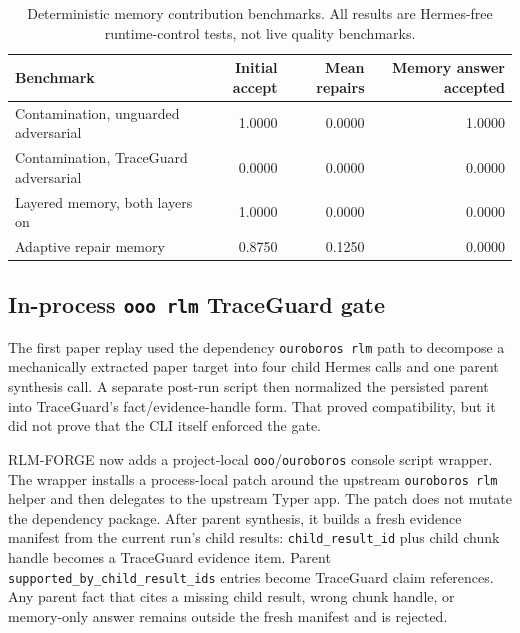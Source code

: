 \documentclass[11pt,a4paper]{article}
\begin{document}
\begin{table}[t]
\centering
\caption{Deterministic memory contribution benchmarks. All results are
Hermes-free runtime-control tests, not live quality benchmarks.}
\label{tab:memory-contribution}
\small
\begin{tabular}{lrrr}
\toprule
Benchmark & Initial accept & Mean repairs & Memory answer accepted \\
\midrule
Contamination, unguarded adversarial & 1.0000 & 0.0000 & 1.0000 \\
Contamination, TraceGuard adversarial & 0.0000 & 0.0000 & 0.0000 \\
Layered memory, both layers on & 1.0000 & 0.0000 & 0.0000 \\
Adaptive repair memory & 0.8750 & 0.1250 & 0.0000 \\
\bottomrule
\end{tabular}
\end{table}

\subsection{In-process \texttt{ooo rlm} TraceGuard gate}
\label{sec:inprocess-gate}

The first paper replay used the dependency \texttt{ouroboros rlm} path to
decompose a mechanically extracted paper target into four child Hermes calls
and one parent synthesis call. A separate post-run script then normalized the
persisted parent into TraceGuard's fact/evidence-handle form. That proved
compatibility, but it did not prove that the CLI itself enforced the gate.

RLM-FORGE now adds a project-local \texttt{ooo}/\texttt{ouroboros} console
script wrapper. The wrapper installs a process-local patch around the upstream
\texttt{ouroboros rlm} helper and then delegates to the upstream Typer app.
The patch does not mutate the dependency package. After parent synthesis, it
builds a fresh evidence manifest from the current run's child results:
\texttt{child\_result\_id} plus child chunk handle becomes a
TraceGuard evidence item. Parent \texttt{supported\_by\_child\_result\_ids}
entries become TraceGuard claim references. Any parent fact that cites a
missing child result, wrong chunk handle, or memory-only answer remains outside
the fresh manifest and is rejected.
\end{document}
